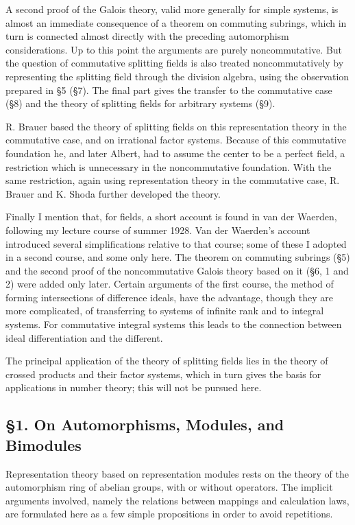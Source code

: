 \documentclass[11pt]{article}
\begin{document}
A second proof of the Galois theory, valid more generally for simple systems, is almost an immediate consequence of a theorem on commuting subrings, which in turn is connected almost directly with the preceding automorphism considerations. Up to this point the arguments are purely noncommutative. But the question of commutative splitting fields is also treated noncommutatively by representing the splitting field through the division algebra, using the observation prepared in §5 (§7). The final part gives the transfer to the commutative case (§8) and the theory of splitting fields for arbitrary systems (§9).

R. Brauer based the theory of splitting fields on this representation theory in the commutative case, and on irrational factor systems. Because of this commutative foundation he, and later Albert, had to assume the center to be a perfect field, a restriction which is unnecessary in the noncommutative foundation. With the same restriction, again using representation theory in the commutative case, R. Brauer and K. Shoda further developed the theory.

Finally I mention that, for fields, a short account is found in van der Waerden, following my lecture course of summer 1928. Van der Waerden's account introduced several simplifications relative to that course; some of these I adopted in a second course, and some only here. The theorem on commuting subrings (§5) and the second proof of the noncommutative Galois theory based on it (§6, 1 and 2) were added only later. Certain arguments of the first course, the method of forming intersections of difference ideals, have the advantage, though they are more complicated, of transferring to systems of infinite rank and to integral systems. For commutative integral systems this leads to the connection between ideal differentiation and the different.

The principal application of the theory of splitting fields lies in the theory of crossed products and their factor systems, which in turn gives the basis for applications in number theory; this will not be pursued here.

\subsection*{§1. On Automorphisms, Modules, and Bimodules}

Representation theory based on representation modules rests on the theory of the automorphism ring of abelian groups, with or without operators. The implicit arguments involved, namely the relations between mappings and calculation laws, are formulated here as a few simple propositions in order to avoid repetitions.
\end{document}
